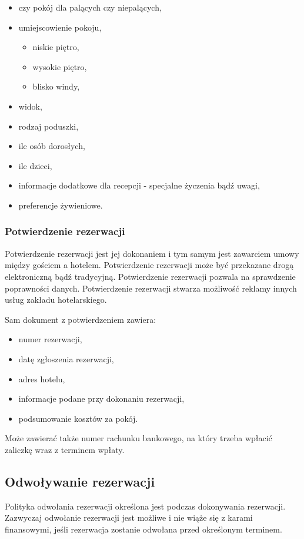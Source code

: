\documentclass[a4paper,onecolumn,oneside,11pt,wide,floatssmall]{mwrep}
\theoremstyle{definition}
\theoremstyle{plain}%
\theoremstyle{remark}
\begin{document}
\begin{itemize}
  \item czy pokój dla palących czy niepalących,
  \item umiejscowienie pokoju,
  \begin{itemize}
    \item niskie piętro,
    \item wysokie piętro,
    \item blisko windy,
  \end{itemize}
  \item widok,
  \item rodzaj poduszki,
  \item ile osób dorosłych,
  \item ile dzieci,
  \item informacje dodatkowe dla recepcji - specjalne życzenia bądź uwagi,
  \item preferencje żywieniowe.
\end{itemize}


\subsubsection{Potwierdzenie rezerwacji}
Potwierdzenie rezerwacji jest jej dokonaniem i tym samym jest 
zawarciem umowy między gościem a hotelem. Potwierdzenie rezerwacji może 
być przekazane drogą elektroniczną bądź tradycyjną. Potwierdzenie rezerwacji 
pozwala na sprawdzenie poprawności danych. Potwierdzenie rezerwacji stwarza 
możliwość reklamy innych usług zakładu hotelarskiego. 

Sam dokument z potwierdzeniem zawiera:
\begin{itemize}
  \item numer rezerwacji,
  \item datę zgłoszenia rezerwacji,
  \item adres hotelu,
  \item informacje podane przy dokonaniu rezerwacji,
  \item podsumowanie kosztów za pokój.
\end{itemize}

Może zawierać także numer rachunku bankowego, na który trzeba wpłacić 
zaliczkę wraz z terminem wpłaty.

\subsection{Odwoływanie rezerwacji}
Polityka odwołania rezerwacji określona jest podczas dokonywania 
rezerwacji. Zazwyczaj odwołanie rezerwacji jest możliwe i nie wiąże się z karami finansowymi, 
jeśli rezerwacja zostanie odwołana przed określonym terminem. 
\end{document}
